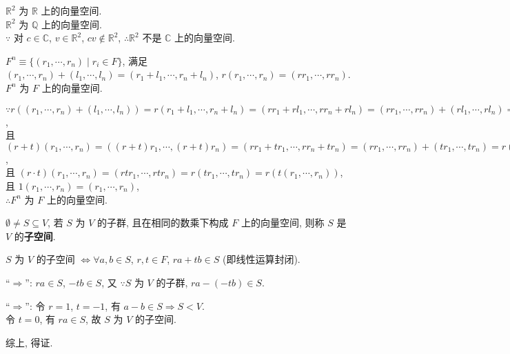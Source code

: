 \documentclass{note}
\begin{document}
\begin{eg}
    $\mathbb{R}^2$ 为 $\mathbb{R}$ 上的向量空间.\\
    $\mathbb{R}^2$ 为 $\mathbb{Q}$ 上的向量空间.\\
    $\because$ 对 $c\in\mathbb{C}$, $v\in\mathbb{R}^2$, $cv\notin\mathbb{R}^2$, $\therefore\mathbb{R}^2$ 不是 $\mathbb{C}$ 上的向量空间.
\end{eg}

\begin{eg}
    $F^n\equiv\{(r_1,\cdots,r_n)\mid r_i\in F\}$, 满足 $(r_1,\cdots,r_n)+(l_1,\cdots,l_n)=(r_1+l_1,\cdots,r_n+l_n)$, $r(r_1,\cdots,r_n)=(rr_1,\cdots,rr_n)$. $F^n$ 为 $F$ 上的向量空间.
\end{eg}
\begin{pf}
    $\because r((r_1,\cdots,r_n)+(l_1,\cdots,l_n))=r(r_1+l_1,\cdots,r_n+l_n)=(rr_1+rl_1,\cdots,rr_n+rl_n)=(rr_1,\cdots,rr_n)+(rl_1,\cdots,rl_n)=r(r_1,\cdots,r_n)+r(l_1,\cdots,l_n)$,\\
    且 $(r+t)(r_1,\cdots,r_n)=((r+t)r_1,\cdots,(r+t)r_n)=(rr_1+tr_1,\cdots,rr_n+tr_n)=(rr_1,\cdots,rr_n)+(tr_1,\cdots,tr_n)=r(r_1,\cdots,r_n)+t(r_1,\cdots,r_n)$,\\
    且 $(r\cdot t)(r_1,\cdots,r_n)=(rtr_1,\cdots,rtr_n)=r(tr_1,\cdots,tr_n)=r(t(r_1,\cdots,r_n))$,\\
    且 $1(r_1,\cdots,r_n)=(r_1,\cdots,r_n)$,\\
    $\therefore F^n$ 为 $F$ 上的向量空间.
\end{pf}

\begin{df}[子空间]
    $\emptyset\neq S\subseteq V$, 若 $S$ 为 $V$ 的子群, 且在相同的数乘下构成 $F$ 上的向量空间, 则称 $S$ 是 $V$ 的\textbf{子空间}.
\end{df}

\begin{thm}
    $S$ 为 $V$ 的子空间 $\Longleftrightarrow\forall a,b\in S$, $r,t\in F$, $ra+tb\in S$ (即线性运算封闭).
\end{thm}
\begin{pf}
    ``$\Longrightarrow$'': $ra\in S$, $-tb\in S$, 又 $\because S$ 为 $V$ 的子群, $ra-(-tb)\in S$.

    ``$\Longrightarrow$'': 令 $r=1$, $t=-1$, 有 $a-b\in S\Longrightarrow S<V$.\\
    令 $t=0$, 有 $ra\in S$, 故 $S$ 为 $V$ 的子空间.

    综上, 得证.
\end{pf}
\end{document}
